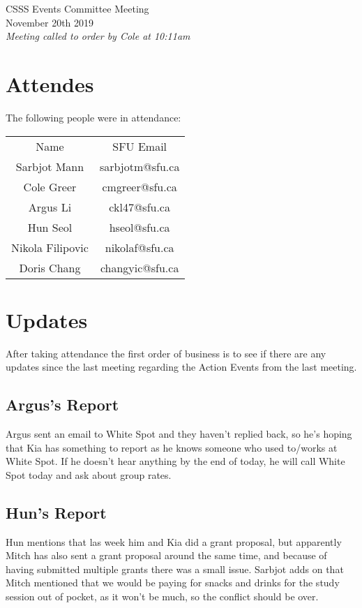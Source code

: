\documentclass[12pt]{article}
\begin{document}
\begin{center}
CSSS Events Committee Meeting \\
November 20th 2019 \\
\em Meeting called to order by Cole at 10:11am
\end{center}
\tableofcontents
\newpage 
\section{Attendes} \label{sec:Introduction}
The following people were in attendance: 
\begin{table}[h]
\centering
\begin{tabular}{cc}
Name                   & SFU Email             \\
Sarbjot Mann           & sarbjotm@sfu.ca       \\
Cole Greer             & cmgreer@sfu.ca        \\
Argus Li               & ckl47@sfu.ca          \\
Hun Seol               & hseol@sfu.ca          \\
Nikola Filipovic  & nikolaf@sfu.ca  \\
Doris Chang            & changyic@sfu.ca      

\end{tabular}
\end{table}

\section{Updates} \label{sec:Updates}

\noindent After taking attendance the first order of business is to see if there are any updates since the last meeting regarding the Action Events from the last meeting.

\subsection{Argus's Report}
\noindent Argus sent an email to White Spot and they haven't replied back, so he's hoping that Kia has something to report as he knows someone who used to/works at White Spot. If he doesn't hear anything by the end of today, he will call White Spot today and ask about group rates. 


\subsection{Hun's Report}
\noindent Hun mentions that las week him and Kia did a grant proposal, but apparently Mitch has also sent a grant proposal around the same time, and because of having submitted multiple grants there was a small issue. Sarbjot adds on that Mitch mentioned that we would be paying for snacks and drinks for the study session out of pocket, as it won't be much, so the conflict should be over. 
\end{document}
